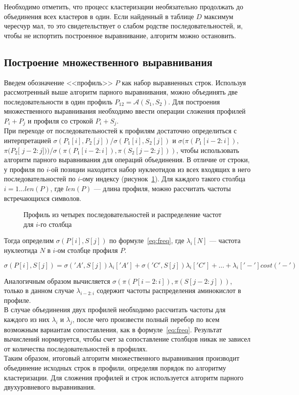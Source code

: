 \indent Необходимо отметить, что процесс кластеризации необязательно продолжать до объединения всех кластеров в один. Если найденный в таблице $D$ максимум чересчур мал, то это свидетельствует о слабом родстве последовательностей, и, чтобы не испортить построенное выравнивание, алгоритм можно остановить.

\subsection[Построение множественного выравнивания]{\large Построение множественного выравнивания}
\hspace{\parindent} Введем обозначение <<профиль>> $P$ как набор выравненных строк. Используя рассмотренный выше алгоритм парного выравнивания, можно объединять две последовательности в один профиль $P_{12}=\mathcal{A}(S_1, S_2)$. Для построения множественного выравнивания необходимо ввести операции сложения профилей $P_i + P_j$ и профиля со строкой $P_i + S_j$.\\
\indent При переходе от последовательностей к профилям достаточно определиться с интерпретацией $\sigma(P_1[i], P_2[j])$/$\sigma(P_1[i], S_2[j])$ и $\sigma(\pi(P_1[i-2:i]),$ $\pi(P_2[$ $j-2:j]))$/$\sigma(\pi(P_1[i-2:i]), \pi(S_2[j-2:j]))$, чтобы использовать алгоритм парного выравнивания для операций объединения. В отличие от строки, у профиля по $i$-ой позиции находится набор нуклеотидов из всех входящих в него последовательностей по $i$-ому индексу (рисунок~\ref{ris:profile}). Для каждого такого столбца $i=1 \dots len(P)$, где $len(P)$ --- длина профиля, можно рассчитать частоты встречающихся символов.

\begin{figure}[h]
	\caption{Профиль из четырех последовательностей и распределение частот для $i$-го столбца}
	\label{ris:profile}
\end{figure}

Тогда определим $\sigma(P[i], S[j])$ по формуле~\ref{eq:freq}, где $\lambda_i[N]$ --- частота нуклеотида $N$ в $i$-ом столбце профиля $P$.

\begin{equation}\label{eq:freq}
\sigma(P[i], S[j])=\sigma('A', S[j])\lambda_i['A']+\sigma('C', S[j])\lambda_i['C']+ \dots +\lambda_i['-']cost('-')
\end{equation}

Аналогичным образом вычисляется $\sigma(\pi(P[i-2:i]), \pi(S[j-2:j]))$, только в данном случае $\lambda_{i-2:i}$ содержит частоты распределения аминокислот в профиле.\\
\indent В случае объединения двух профилей необходимо рассчитать частоты для каждого из них $\lambda_i$ и $\lambda_j$, после чего произвести полный перебор по всем возможным вариантам сопоставления, как в формуле~\ref{eq:freq}. Результат вычислений нормируется, чтобы счет за сопоставление столбцов никак не зависел от количества последовательностей в профилях.\\
\indent Таким образом, итоговый алгоритм множественного выравнивания производит объединение исходных строк в профили, определяя порядок по алгоритму кластеризации. Для сложения профилей и строк используется алгоритм парного двухуровневого выравнивания.